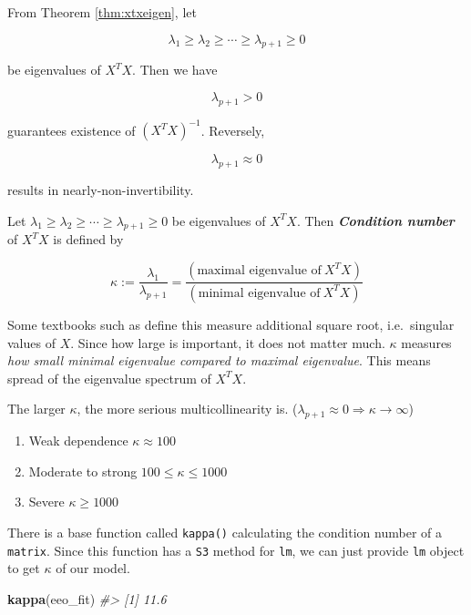 \documentclass[]{book}
\newenvironment{Shaded}{\begin{snugshade}}{\end{snugshade}}
\newcommand{\CommentTok}[1]{\textcolor[rgb]{0.56,0.35,0.01}{\textit{#1}}}
\newcommand{\KeywordTok}[1]{\textcolor[rgb]{0.13,0.29,0.53}{\textbf{#1}}}
\newcommand{\NormalTok}[1]{#1}
\theoremstyle{definition}
\theoremstyle{definition}
\theoremstyle{definition}
\theoremstyle{remark}
\let\BeginKnitrBlock\begin \let\EndKnitrBlock\end
\begin{document}
From Theorem \ref{thm:xtxeigen}, let

\[\lambda_1 \ge \lambda_2 \ge \cdots \ge \lambda_{p + 1} \ge 0\]

be eigenvalues of \(X^T X\). Then we have

\[\lambda_{p + 1} > 0\]

guarantees existence of \((X^T X)^{-1}\). Reversely,

\[\lambda_{p + 1} \approx 0\]

results in nearly-non-invertibility.

\BeginKnitrBlock{definition}[Condition number]
\protect\hypertarget{def:kondition}{}{\label{def:kondition} {} }Let \(\lambda_1 \ge \lambda_2 \ge \cdots \ge \lambda_{p + 1} \ge 0\) be eigenvalues of \(X^T X\). Then \textbf{\textit{Condition number}} of \(X^T X\) is defined by

\[\kappa := \frac{\lambda_1}{\lambda_{p + 1}} = \frac{(\text{maximal eigenvalue of} \: X^TX)}{(\text{minimal eigenvalue of} \: X^TX)}\]
\EndKnitrBlock{definition}

Some textbooks such as \citet{Chatterjee:2015aa} define this measure additional square root, i.e.~singular values of \(X\). Since how large is important, it does not matter much. \(\kappa\) measures \emph{how small minimal eigenvalue compared to maximal eigenvalue}. This means spread of the eigenvalue spectrum of \(X^T X\).

\BeginKnitrBlock{conjecture}
\protect\hypertarget{cnj:kappathres}{}{\label{cnj:kappathres} }The larger \(\kappa\), the more serious multicollinearity is. (\(\lambda_{p + 1} \approx 0 \Rightarrow \kappa \rightarrow \infty\))

\begin{enumerate}
  \item Weak dependence $\kappa \approx 100$
  \item Moderate to strong $100 \le \kappa \le 1000$
  \item Severe $\kappa \ge 1000$
\end{enumerate}
\EndKnitrBlock{conjecture}

There is a base function called \texttt{kappa()} calculating the condition number of a \texttt{matrix}. Since this function has a \texttt{S3} method for \texttt{lm}, we can just provide \texttt{lm} object to get \(\kappa\) of our model.

\begin{Shaded}
\begin{Highlighting}[]
\KeywordTok{kappa}\NormalTok{(eeo_fit)}
\CommentTok{#> [1] 11.6}
\end{Highlighting}
\end{Shaded}
\end{document}
